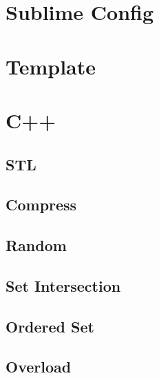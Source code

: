 \section{Sublime Config}
\raggedbottom
\hrulefill

\section{Template}
\raggedbottom
\hrulefill

\section{C++}
\subsection{STL}
\raggedbottom
\subsection{Compress}
\raggedbottom
\subsection{Random}
\raggedbottom
\subsection{Set Intersection}
\raggedbottom
\subsection{Ordered Set}
\raggedbottom
\subsection{Overload}
\raggedbottom

\hrulefill

